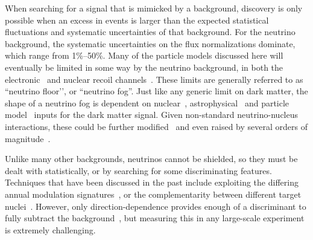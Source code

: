 When searching for a signal that is mimicked by a background, discovery is only possible when an excess in events is larger than the expected statistical fluctuations and systematic uncertainties of that background. For the neutrino background, the systematic uncertainties on the flux normalizations dominate, which range from 1\%--50\%. Many of the particle models discussed here will eventually be limited in some way by the neutrino background, in both the electronic~\cite{Wyenberg:2018eyv,Essig:2018tss} and nuclear recoil channels~\cite{Billard:2013qya,Baudis:2013qla,Dent:2016iht,Dent:2016wor,Dent:2019krz}. These limits are generally referred to as ``neutrino floor’’, or ``neutrino fog''. Just like any generic limit on dark matter, the shape of a neutrino fog is dependent on nuclear~\cite{Papoulias:2018uzy}, astrophysical~\cite{OHare:2016pjy} and particle model~\cite{Dent:2016iht,Dent:2016wor,Gelmini:2018ogy} inputs for the dark matter signal. Given non-standard neutrino-nucleus interactions, these could be further modified~\cite{AristizabalSierra:2017joc,Gonzalez-Garcia:2018dep} and even raised by several orders of magnitude~\cite{Boehm:2018sux}.

Unlike many other backgrounds, neutrinos cannot be shielded, so they must be dealt with statistically, or by searching for some discriminating features. Techniques that have been discussed in the past include exploiting the differing annual modulation signatures~\cite{Davis:2014ama}, or the complementarity between different target nuclei~\cite{Ruppin:2014bra}. However, only direction-dependence provides enough of a discriminant to fully subtract the background~\cite{Grothaus:2014hja,O'Hare:2015mda,Mayet:2016zxu,Franarin:2016ppr,OHare:2017rag}, but measuring this in any large-scale experiment is extremely challenging. 

